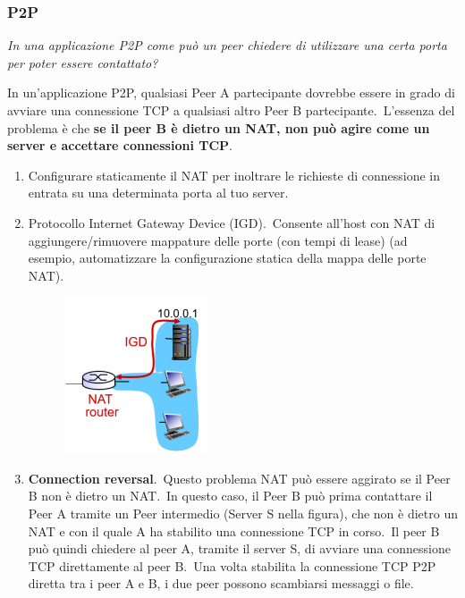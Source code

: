 \subsubsection{P2P}

\emph{In una applicazione P2P come può un peer chiedere di utilizzare una certa porta per poter essere contattato?}

In un'applicazione P2P, qualsiasi Peer A partecipante dovrebbe essere in grado di avviare una connessione TCP a qualsiasi altro Peer B partecipante.\
L'essenza del problema è che \textbf{se il peer B è dietro un NAT, non può agire come un server e accettare connessioni TCP}.

\begin{enumerate}
    \item Configurare staticamente il NAT per inoltrare le richieste di connessione in entrata su una determinata porta al tuo server.
    \item Protocollo Internet Gateway Device (IGD).\
          Consente all'host con NAT di aggiungere/rimuovere mappature delle porte (con tempi di lease) (ad esempio, automatizzare la configurazione statica della mappa delle porte NAT).
          \begin{figure}[H]
              \centering
              \includegraphics[width=0.4\textwidth]{immagini/IGD.png}
          \end{figure}
    \item \textbf{Connection reversal}.\
          Questo problema NAT può essere aggirato se il Peer B non è dietro un NAT.\
          In questo caso, il Peer B può prima contattare il Peer A tramite un Peer intermedio (Server S nella figura), che non è dietro un NAT e con il quale A ha stabilito una connessione TCP in corso.\
          Il peer B può quindi chiedere al peer A, tramite il server S, di avviare una connessione TCP direttamente al peer B.\
          Una volta stabilita la connessione TCP P2P diretta tra i peer A e B, i due peer possono scambiarsi messaggi o file.

\end{enumerate}

